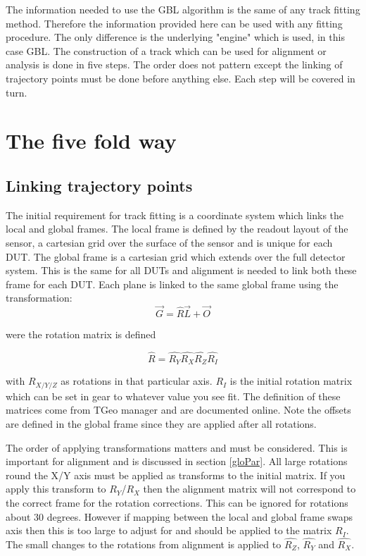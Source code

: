 The information needed to use the GBL algorithm is the same of any track fitting method. Therefore the information provided here can be used with any fitting procedure. The only difference is the underlying "engine" which is used, in this case GBL. The construction of a track which can be used for alignment or analysis is done in five steps. The order does not pattern except the linking of trajectory points must be done before anything else. Each step will be covered in turn. 
\section{The five fold way}
\subsection{Linking trajectory points}
The initial requirement for track fitting is a coordinate system which links the local and global frames. The local frame is defined by the readout layout of the sensor, a cartesian grid over the surface of the sensor and is unique for each DUT. The global frame is a cartesian grid which extends over the full detector system. This is the same for all DUTs and alignment is needed to link both these frame for each DUT. Each plane is linked to the same global frame using the transformation:
\begin{equation}
 \overrightarrow{G} =   \hat{R}\overrightarrow{L} +  \overrightarrow{O}
\end{equation}

were the rotation matrix is defined

\begin{equation}
 \hat{R} = \hat{R_Y}\hat{R_X}\hat{R_Z}\hat{R_I}
\end{equation}

with $R_{X/Y/Z}$ as rotations in that particular axis. $R_I$ is the initial rotation matrix which can be set in gear to whatever value you see fit. The definition of these matrices come from TGeo manager and are documented online. Note the offsets are defined in the global frame since they are applied after all rotations. 

The order of applying transformations matters and must be considered. This is important for alignment and is discussed in section \ref{gloPar}. All large rotations round the X/Y axis must be applied as transforms to the initial matrix. If you apply this transform to $R_Y$/$R_X$ then the alignment matrix will not correspond to the correct frame for the rotation corrections. This can be ignored for rotations about 30 degrees. However if mapping between the local and global frame swaps axis then this is too large to adjust for and should be applied to the matrix $R_I$. The small changes to the rotations from alignment is applied to $\hat{R_Z}$,  $\hat{R_Y}$ and $\hat{R_X}$.


